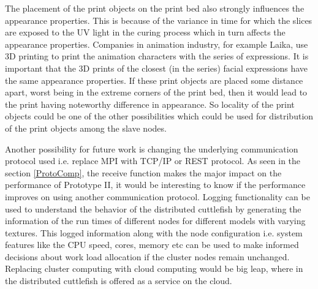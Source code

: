 The placement of the print objects on the print bed also strongly influences the appearance properties. This is because of the variance in time for which the slices are exposed to the UV light in the curing process which in turn affects the appearance properties. Companies in animation industry, for example Laika, use 3D printing to print the animation characters with the series of expressions. It is important that the 3D prints of the closest (in the series) facial expressions have the same appearance properties. If these print objects are placed some distance apart, worst being in the extreme corners of the print bed, then it would lead to the print having noteworthy difference in appearance. So locality of the print objects could be one of the other possibilities which could be used for distribution of the print objects among the slave nodes. \newline 

Another possibility for future work is changing the underlying communication protocol used i.e. replace MPI with TCP/IP or REST protocol. As seen in the section \ref{ProtoComp}, the receive function makes the major impact  on the performance of Prototype II, it would be interesting to know if the performance improves on using another communication protocol. Logging functionality can be used to understand the behavior of the distributed cuttlefish by generating the information of the run times of different nodes for different models with varying textures. This logged information along with the node configuration i.e. system features like the CPU speed, cores, memory etc can be used to make informed decisions about work load allocation if the cluster nodes remain unchanged. Replacing cluster computing with cloud computing would be big leap, where in the distributed cuttlefish is offered as a service on the cloud. \newline   
